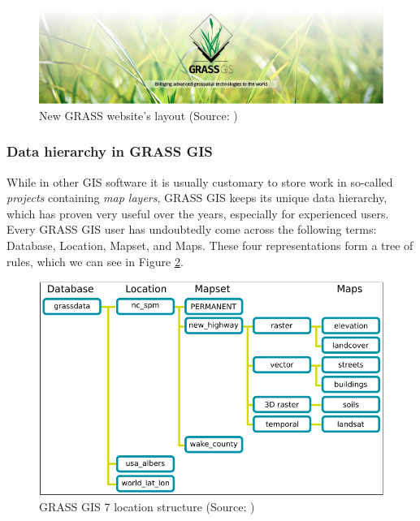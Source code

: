 \documentclass[a4paper,10pt,twoside]{article}
\begin{document}
\vspace{0.7cm}
\begin{figure}[hbt!]
\begin{center}
\includegraphics[width=17cm]{../pictures/grass_gis.png} 
\caption[New GRASS website's layout]{New GRASS website's layout (Source: \cite{grass})}
\label{fig:grass_gis}
\end{center}
\end{figure}

\newpage
\vspace*{-1cm}
\subsubsection{Data hierarchy in GRASS GIS}
\label{subsection:hierarchy}
\noindent
\large

\noindent While in other GIS software it is usually customary to store
work in so-called \textit{projects} containing \textit{map layers},
GRASS GIS keeps its unique data hierarchy, which has proven very
useful over the years, especially for experienced users. Every GRASS
GIS user has undoubtedly come across the following terms: Database,
Location, Mapset, and Maps. These four representations form a tree of
rules, which we can see in Figure \ref{fig:grass_data_hierarchy}.

\vspace{0.3cm}
\begin{figure}[hbt!]
\begin{center}
\includegraphics[width=14cm]{../pictures/grass_data_hiearchy.png} 
\caption[GRASS GIS 7 location structure]{GRASS GIS 7 location structure (Source: \cite{hierarchy})}
\label{fig:grass_data_hierarchy}
\end{center}
\end{figure}
\end{document}
